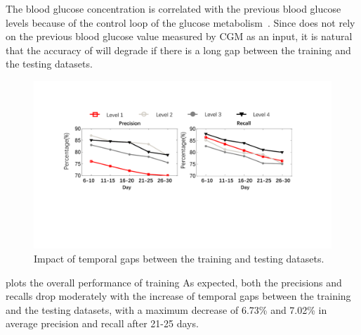 The blood glucose concentration is correlated with the previous blood glucose levels because of the control loop of the glucose metabolism~\cite{bib:TBE07:Dalla, bib:PE04:Hovorka, bib:IJNMBE16:Oviedo}.
Since \sysname does not rely on the previous blood glucose value measured by CGM as an input, it is natural that the accuracy of \sysname will degrade if there is a long gap between the training and the testing datasets.
\begin{figure}[h]
  \centering
  \includegraphics[width=0.8\columnwidth]{./img/Performance_gap2.pdf}
  \caption{Impact of temporal gaps between the training and testing datasets.}
  \label{fig:per_under_various_pred_days}
\end{figure}

 plots the overall performance of training 
As expected, both the precisions and recalls drop moderately with the increase of temporal gaps between the training and the testing datasets, with a maximum decrease of 6.73\% and 7.02\% in average precision and recall after 21-25 days.

